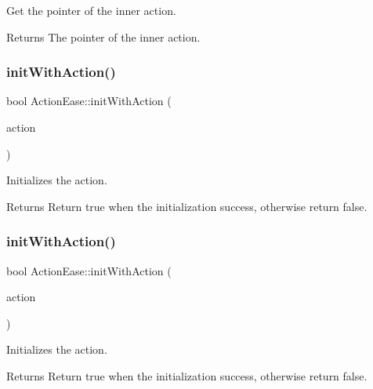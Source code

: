 Get the pointer of the inner action. 

\begin{DoxyReturn}{Returns}
The pointer of the inner action. 
\end{DoxyReturn}
\mbox{\label{classActionEase_a57660327c119242bbb1fe682fc723b5a}} 
\subsubsection{\texorpdfstring{init\+With\+Action()}{initWithAction()}\hspace{0.1cm}{\footnotesize\ttfamily [1/2]}}
{\footnotesize\ttfamily bool Action\+Ease\+::init\+With\+Action (\begin{DoxyParamCaption}\item[{\hyperlink{classActionInterval}{Action\+Interval} $\ast$}]{action }\end{DoxyParamCaption})}



Initializes the action. 

\begin{DoxyReturn}{Returns}
Return true when the initialization success, otherwise return false. 
\end{DoxyReturn}
\mbox{\label{classActionEase_a57660327c119242bbb1fe682fc723b5a}} 
\subsubsection{\texorpdfstring{init\+With\+Action()}{initWithAction()}\hspace{0.1cm}{\footnotesize\ttfamily [2/2]}}
{\footnotesize\ttfamily bool Action\+Ease\+::init\+With\+Action (\begin{DoxyParamCaption}\item[{\hyperlink{classActionInterval}{Action\+Interval} $\ast$}]{action }\end{DoxyParamCaption})}



Initializes the action. 

\begin{DoxyReturn}{Returns}
Return true when the initialization success, otherwise return false. 
\end{DoxyReturn}
\mbox{\label{classActionEase_ab99eb083fa033fae1d6c948fdc730782}} 
